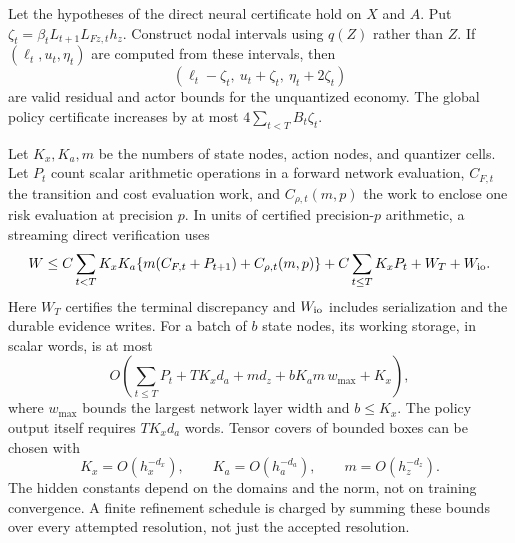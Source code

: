 \begin{theorem}
\label{thm:r41dimension}
Let the hypotheses of the direct neural certificate hold on $X$ and $A$.
Put $\zeta_t=\beta_t L_{t+1}L_{Fz,t}h_z$. Construct nodal intervals using
$q(Z)$ rather than $Z$. If $(\ell_t,u_t,\eta_t)$ are computed from these
intervals, then
\[
 (\ell_t-\zeta_t,\ u_t+\zeta_t,\ \eta_t+2\zeta_t)
\]
are valid residual and actor bounds for the unquantized economy. The global
policy certificate increases by at most $4\sum_{t<T}B_t\zeta_t$.

Let $K_x,K_a,m$ be the numbers of state nodes, action nodes, and quantizer
cells. Let $P_t$ count scalar arithmetic operations in a forward network
evaluation, $C_{F,t}$ the transition and cost evaluation work, and
$C_{\rho,t}(m,p)$ the work to enclose one risk evaluation at precision $p$.
In units of certified precision-$p$ arithmetic, a streaming direct
verification uses
\begin{align*}
 W\leq C\sum_{t<T}K_xK_a
 \{m(C_{F,t}+P_{t+1})+C_{\rho,t}(m,p)\}
 +C\sum_{t\leq T}K_xP_t+W_T+W_{\rm io}.
\end{align*}
Here $W_T$ certifies the terminal discrepancy and $W_{\rm io}$ includes
serialization and the durable evidence writes. For a batch of $b$ state
nodes, its working storage, in scalar words, is at most
\[
 O\!\left(\sum_{t\leq T}P_t+TK_xd_a+md_z+
 bK_am\,w_{\max}+K_x\right),
\]
where $w_{\max}$ bounds the largest network layer width and $b\leq K_x$.
The policy output itself requires $TK_xd_a$ words. Tensor covers of bounded
boxes can be chosen with
\[
 K_x=O(h_x^{-d_x}),\qquad K_a=O(h_a^{-d_a}),\qquad
 m=O(h_z^{-d_z}).
\]
The hidden constants depend on the domains and the norm, not on training
convergence. A finite refinement schedule is charged by summing these
bounds over every attempted resolution, not just the accepted resolution.
\end{theorem}
